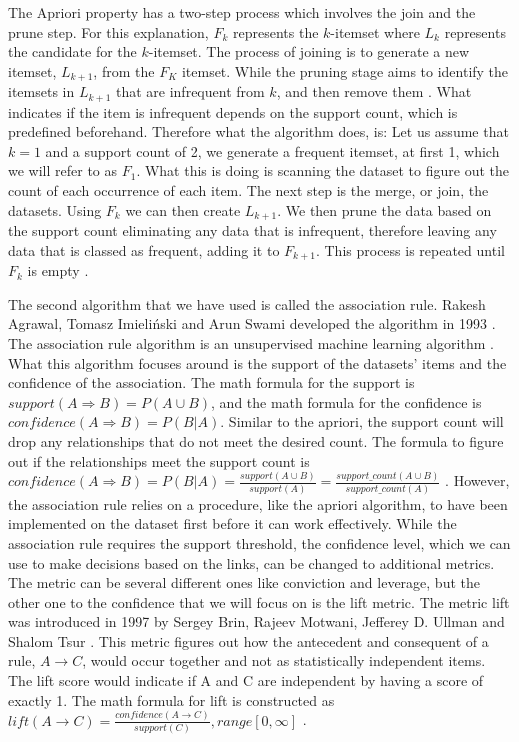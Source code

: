\documentclass[a4paper,10pt]{article}
\begin{document}
The Apriori property has a two-step process which involves the join and the prune step. For this explanation, $F_k$ represents the $k$-itemset where $L_k$ represents the candidate for the $k$-itemset. The process of joining is to generate a new itemset, $L_{k+1}$, from the $F_K$ itemset. While the pruning stage aims to identify the itemsets in $L_{k+1}$ that are infrequent from $k$, and then remove them \cite{jingjingslides}. What indicates if the item is infrequent depends on the support count, which is predefined beforehand. Therefore what the algorithm does, is: Let us assume that $k=1$ and a support count of 2, we generate a frequent itemset, at first 1, which we will refer to as $F_1$. What this is doing is scanning the dataset to figure out the count of each occurrence of each item. The next step is the merge, or join, the datasets. Using $F_k$ we can then create $L_{k+1}$. We then prune the data based on the support count eliminating any data that is infrequent, therefore leaving any data that is classed as frequent, adding it to $F_{k+1}$. This process is repeated until $F_k$ is empty \cite{jingjingslides, han2011data}.

The second algorithm that we have used is called the association rule. Rakesh Agrawal, Tomasz Imieli{\'n}ski and Arun Swami developed the algorithm in 1993 \cite{agrawal1993mining}. The association rule algorithm is an unsupervised machine learning algorithm \cite{geron2019hands}. What this algorithm focuses around is the support of the datasets' items and the confidence of the association. The math formula for the support is $support(A \Rightarrow B) = P(A \cup B)$, and the math formula for the confidence is $confidence(A \Rightarrow B) = P(B|A)$.  Similar to the apriori, the support count will drop any relationships that do not meet the desired count. The formula to figure out if the relationships meet the support count is $confidence(A \Rightarrow B) = P(B|A) = \frac{support(A \cup B)}{support(A)} = \frac{support\_count(A \cup B)}{support\_count(A)}$ \cite{jingjingslides, han2011data}. However, the association rule relies on a procedure, like the apriori algorithm, to have been implemented on the dataset first before it can work effectively. While the association rule requires the support threshold, the confidence level, which we can use to make decisions based on the links, can be changed to additional metrics. The metric can be several different ones like conviction and leverage, but the other one to the confidence that we will focus on is the lift metric. The metric lift was introduced in 1997 by Sergey Brin, Rajeev Motwani, Jefferey D. Ullman and Shalom Tsur \cite{brin1997dynamic}. This metric figures out how the antecedent and consequent of a rule, $A \rightarrow C$, would occur together and not as statistically independent items. The lift score would indicate if A and C are independent by having a score of exactly 1. The math formula for lift is constructed as $lift(A \rightarrow C) = \frac{confidence(A \rightarrow C)}{support(C)}, range[0, \infty]$ \cite{brin1997dynamic, jingjingslides}.
\end{document}
